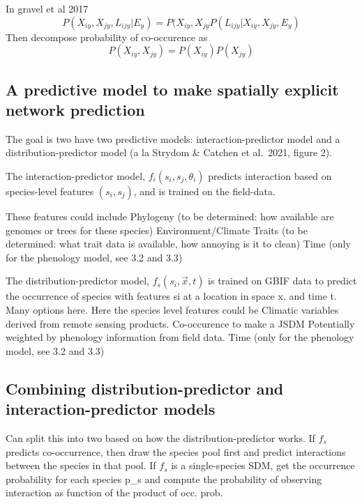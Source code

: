 \documentclass[10pt,oneside]{article}
\begin{document}
In gravel et al 2017
\[P(X_{iy}, X_{jy}, L_{ijy} | E_y) = P(X_{iy},X_{jy}P(L_{ijy} | X_{iy}, X_{jy}, E_y)\]
Then decompose probability of co-occurence as
\[P(X_{iy}, X_{jy}) = P(X_{iy})P(X_{jy})\]

\hypertarget{a-predictive-model-to-make-spatially-explicit-network-prediction}{%
\subsection{A predictive model to make spatially explicit network
prediction}\label{a-predictive-model-to-make-spatially-explicit-network-prediction}}

The goal is two have two predictive models: interaction-predictor model
and a distribution-predictor model (a la Strydom \& Catchen et al.~2021,
figure 2).

The interaction-predictor model, \(f_i(s_i,s_j, \theta_i)\) predicts
interaction based on species-level features \((s_i, s_j)\), and is
trained on the field-data.

These features could include Phylogeny (to be determined: how available
are genomes or trees for these species) Environment/Climate Traits (to
be determined: what trait data is available, how annoying is it to
clean) Time (only for the phenology model, see 3.2 and 3.3)

The distribution-predictor model, \(f_s(s_i, \vec{x}, t)\) is trained on
GBIF data to predict the occurrence of species with features si at a
location in space x, and time t. Many options here. Here the species
level features could be Climatic variables derived from remote sensing
products. Co-occurence to make a JSDM Potentially weighted by phenology
information from field data. Time (only for the phenology model, see 3.2
and 3.3)

\hypertarget{combining-distribution-predictor-and-interaction-predictor-models}{%
\subsection{Combining distribution-predictor and interaction-predictor
models}\label{combining-distribution-predictor-and-interaction-predictor-models}}

Can split this into two based on how the distribution-predictor works.
If \(f_s\) predicts co-occurrence, then draw the species pool first and
predict interactions between the species in that pool. If \(f_s\) is a
single-species SDM, get the occurrence probability for each species p\_s
and compute the probability of observing interaction as function of the
product of occ. prob.
\end{document}
